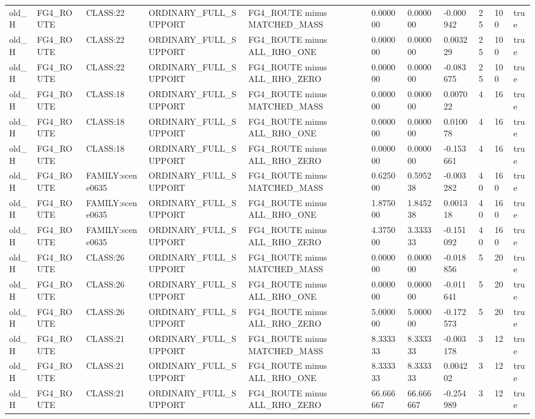 \begin{tabular}{lllllllllll}
old\_H & FG4\_ROUTE & CLASS:22 & ORDINARY\_FULL\_SUPPORT & FG4\_ROUTE minus MATCHED\_MASS & 0.000000 & 0.000000 & -0.000942 & 25 & 100 & true \\
old\_H & FG4\_ROUTE & CLASS:22 & ORDINARY\_FULL\_SUPPORT & FG4\_ROUTE minus ALL\_RHO\_ONE & 0.000000 & 0.000000 & 0.003229 & 25 & 100 & true \\
old\_H & FG4\_ROUTE & CLASS:22 & ORDINARY\_FULL\_SUPPORT & FG4\_ROUTE minus ALL\_RHO\_ZERO & 0.000000 & 0.000000 & -0.083675 & 25 & 100 & true \\
old\_H & FG4\_ROUTE & CLASS:18 & ORDINARY\_FULL\_SUPPORT & FG4\_ROUTE minus MATCHED\_MASS & 0.000000 & 0.000000 & 0.007022 & 4 & 16 & true \\
old\_H & FG4\_ROUTE & CLASS:18 & ORDINARY\_FULL\_SUPPORT & FG4\_ROUTE minus ALL\_RHO\_ONE & 0.000000 & 0.000000 & 0.010078 & 4 & 16 & true \\
old\_H & FG4\_ROUTE & CLASS:18 & ORDINARY\_FULL\_SUPPORT & FG4\_ROUTE minus ALL\_RHO\_ZERO & 0.000000 & 0.000000 & -0.153661 & 4 & 16 & true \\
old\_H & FG4\_ROUTE & FAMILY:scene0635 & ORDINARY\_FULL\_SUPPORT & FG4\_ROUTE minus MATCHED\_MASS & 0.625000 & 0.595238 & -0.003282 & 40 & 160 & true \\
old\_H & FG4\_ROUTE & FAMILY:scene0635 & ORDINARY\_FULL\_SUPPORT & FG4\_ROUTE minus ALL\_RHO\_ONE & 1.875000 & 1.845238 & 0.001318 & 40 & 160 & true \\
old\_H & FG4\_ROUTE & FAMILY:scene0635 & ORDINARY\_FULL\_SUPPORT & FG4\_ROUTE minus ALL\_RHO\_ZERO & 4.375000 & 3.333333 & -0.151092 & 40 & 160 & true \\
old\_H & FG4\_ROUTE & CLASS:26 & ORDINARY\_FULL\_SUPPORT & FG4\_ROUTE minus MATCHED\_MASS & 0.000000 & 0.000000 & -0.018856 & 5 & 20 & true \\
old\_H & FG4\_ROUTE & CLASS:26 & ORDINARY\_FULL\_SUPPORT & FG4\_ROUTE minus ALL\_RHO\_ONE & 0.000000 & 0.000000 & -0.011641 & 5 & 20 & true \\
old\_H & FG4\_ROUTE & CLASS:26 & ORDINARY\_FULL\_SUPPORT & FG4\_ROUTE minus ALL\_RHO\_ZERO & 5.000000 & 5.000000 & -0.172573 & 5 & 20 & true \\
old\_H & FG4\_ROUTE & CLASS:21 & ORDINARY\_FULL\_SUPPORT & FG4\_ROUTE minus MATCHED\_MASS & 8.333333 & 8.333333 & -0.003178 & 3 & 12 & true \\
old\_H & FG4\_ROUTE & CLASS:21 & ORDINARY\_FULL\_SUPPORT & FG4\_ROUTE minus ALL\_RHO\_ONE & 8.333333 & 8.333333 & 0.004202 & 3 & 12 & true \\
old\_H & FG4\_ROUTE & CLASS:21 & ORDINARY\_FULL\_SUPPORT & FG4\_ROUTE minus ALL\_RHO\_ZERO & 66.666667 & 66.666667 & -0.254989 & 3 & 12 & true \\

\end{tabular}
